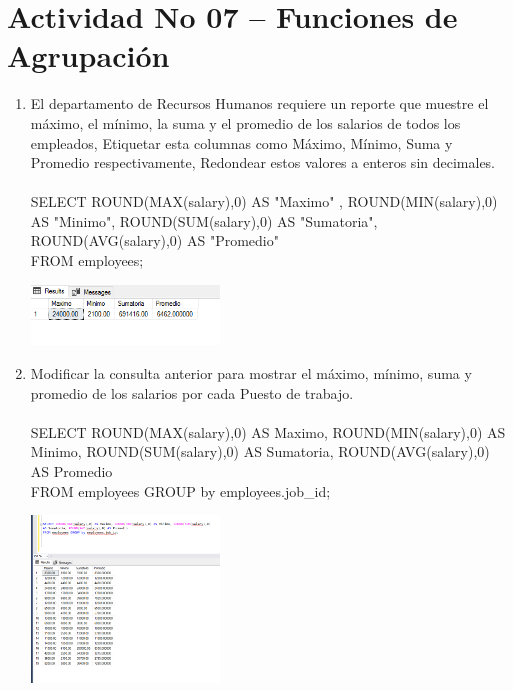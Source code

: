 \section{Actividad No 07 – Funciones de Agrupaci\'on} 
		
\begin{enumerate}[1.]
	\item El departamento de Recursos Humanos requiere un reporte que muestre el máximo, el mínimo, la suma y el promedio de los salarios de todos los empleados, Etiquetar esta columnas como Máximo, Mínimo, Suma y Promedio respectivamente, Redondear estos valores a enteros sin decimales.
	\\
	\\SELECT ROUND(MAX(salary),0) AS "Maximo" , ROUND(MIN(salary),0) AS "Minimo", ROUND(SUM(salary),0) AS "Sumatoria", ROUND(AVG(salary),0) AS "Promedio"
	\\FROM employees;
    	\begin{center}
	\includegraphics[width=5cm]{./Imagenes/a7a1} 
	\end{center}

	\item Modificar la consulta anterior para mostrar el máximo, mínimo, suma y promedio de los salarios por cada Puesto de trabajo. 
		\\
	\\SELECT ROUND(MAX(salary),0) AS Maximo, ROUND(MIN(salary),0) AS Minimo, ROUND(SUM(salary),0)
AS Sumatoria, ROUND(AVG(salary),0) AS Promedio
	\\FROM employees GROUP by employees.job_id;
	 	\begin{center}
	\includegraphics[width=5cm]{./Imagenes/a7a2} 
	\end{center}



\end{enumerate}
